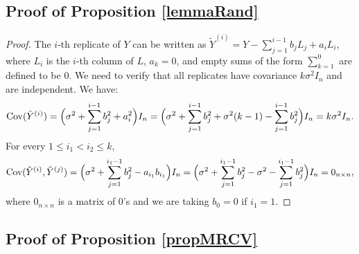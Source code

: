 \documentclass[10pt, reqno]{amsart}
\numberwithin{equation}{section}
\begin{document}
\begin{appendix}
\subsection{Proof of Proposition \ref{lemmaRand}}\label{appLemmaRand}

\begin{proof}
	The $i$-th replicate of $Y$ can be written as $\tilde Y^{(i)} = Y - \sum_{j = 1}^{i-1} b_j L_j + a_iL_i$, where $L_i$ is the $i$-th column of $L$, $a_k = 0$, and empty sums of the form $\sum_{k = 1}^0$ are defined to be 0. We need to verify that all replicates have covariance $k\sigma^2I_n$ and are independent. We have:
	\begin{equation*}
		\mathrm{Cov}(\tilde Y^{(i)}) = \Bigl(\sigma^2 + \sum_{j = 1}^{i-1} b_j^2 + a_i^2\Bigr)I_n = \Bigl(\sigma^2 + \sum_{j = 1}^{i-1} b_j^2 + \sigma^2 (k-1) - \sum_{j = 1}^{i-1} b_j^2\Bigr)I_n = k\sigma^2I_n.
	\end{equation*}
	For every $1\leq i_1 < i_2\leq k$,
	\begin{equation*}
		\mathrm{Cov}(\tilde Y^{(i)}, \tilde Y^{(j)}) = \Bigl(\sigma^2 + \sum_{j = 1}^{i_1 - 1}b_j^2 - a_{i_1}b_{i_1}  \Bigr)I_n = \Bigl(\sigma^2 + \sum_{j = 1}^{i_1 - 1}b_j^2 - \sigma^2 -   \sum_{j = 1}^{i_1 - 1}b_j^2 \Bigr)I_n = 0_{n\times n},
	\end{equation*}
	where $0_{n\times n}$ is a matrix of 0's and we are taking $b_0 = 0$ if $i_1 = 1$.
\end{proof}

\subsection{Proof of Proposition \ref{propMRCV}}


\end{appendix}
\end{document}
